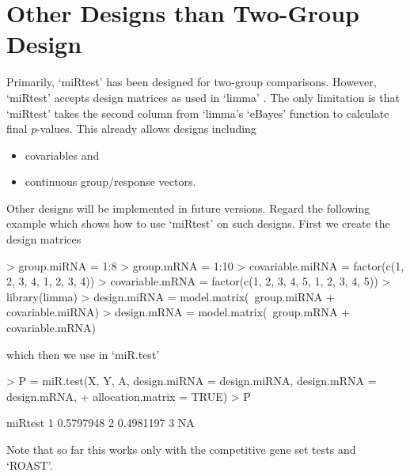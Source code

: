 \documentclass[12pt]{article}
\begin{document}
\section{Other Designs than Two-Group Design \label{designs}}
Primarily, `miRtest' has been designed for two-group comparisons. However, `miRtest' accepts design matrices as used in `limma' \cite[] {smyth_gordon_k_linear_2004}. The only limitation is that `miRtest' takes the second column from `limma's `eBayes' function to calculate final $p$-values. This already allows designs including
\begin{itemize}
 \item covariables and
 \item continuous group/response vectors.
\end{itemize}
Other designs will be implemented in future versions. Regard the following example which shows how to use `miRtest' on such designs. First we create the design matrices
\begin{Schunk}
\begin{Sinput}
> group.miRNA = 1:8
> group.mRNA = 1:10
> covariable.miRNA = factor(c(1, 2, 3, 4, 1, 2, 3, 4))
> covariable.mRNA = factor(c(1, 2, 3, 4, 5, 1, 2, 3, 4, 5))
> library(limma)
> design.miRNA = model.matrix(~group.miRNA + covariable.miRNA)
> design.mRNA = model.matrix(~group.mRNA + covariable.mRNA)
\end{Sinput}
\end{Schunk}
which then we use in `miR.test'
\begin{Schunk}
\begin{Sinput}
> P = miR.test(X, Y, A, design.miRNA = design.miRNA, design.mRNA = design.mRNA, 
+     allocation.matrix = TRUE)
> P
\end{Sinput}
\begin{Soutput}
    miRtest
1 0.5797948
2 0.4981197
3        NA
\end{Soutput}
\end{Schunk}
Note that so far this works only with the competitive gene set tests and `ROAST'.




\end{document}
